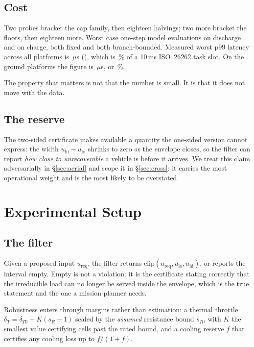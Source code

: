 \documentclass[11pt,letterpaper]{article}
\theoremstyle{definition}
\theoremstyle{remark}
\begin{document}
\subsection{Cost}

Two probes bracket the cap family, then eighteen halvings; two more bracket the floors, then
eighteen more. Worst case \evalDischarge{} one-step model evaluations on discharge and
\evalCharge{} on charge, both fixed and both branch-bounded. Measured worst p99 latency across
all \vPlatforms{} platforms is \worstLatency{}\,$\mu$s (\worstLatencyCase{}), which is
\slotFraction\,\% of a 10\,ms ISO~26262 task slot. On the ground platforms the figure is
\groundLatency{}\,$\mu$s, or \groundSlotPct\,\%.

The property that matters is not that the number is small. It is that it does not move with the
data.

\subsection{The reserve}\label{sec:reserve}

The two-sided certificate makes available a quantity the one-sided version cannot express: the
width $u_{\mathrm{hi}} - u_{\mathrm{lo}}$ shrinks to zero as the envelope closes, so the filter
can report \emph{how close to unrecoverable} a vehicle is before it arrives. We treat this claim
adversarially in \S\ref{sec:aerial} and scope it in \S\ref{sec:cross}: it carries the most
operational weight and is the most likely to be overstated.

\section{Experimental Setup}\label{sec:method}

\subsection{The filter}

Given a proposed input $u_{\mathrm{req}}$, the filter returns
$\mathrm{clip}(u_{\mathrm{req}}, u_{\mathrm{lo}}, u_{\mathrm{hi}})$, or reports the interval
empty. Empty is not a violation: it is the certificate stating correctly that the irreducible
load can no longer be served inside the envelope, which is the true statement and the one a
mission planner needs.

Robustness enters through margins rather than estimation: a thermal throttle
$\delta_T = \delta_{T0} + K(s_R - 1)$ scaled by the \emph{assumed} resistance bound $s_R$, with
$K$ the smallest value certifying cells past the rated bound, and a cooling reserve $f$ that
certifies any cooling loss up to $f/(1+f)$.
\end{document}
